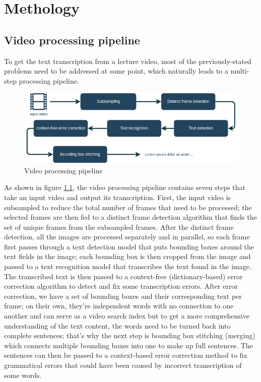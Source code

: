 \chapter{Methology}

\section{Video processing pipeline}

To get the text transcription from a lecture video, most of the previously-stated problems need to be addressed at some point, which naturally leads to a multi-step processing pipeline.

\begin{figure}[H]
        \centering
        \includegraphics[width=140mm]{figures/ocr_pipeline}
        \caption{Video processing pipeline}
        \label{meth:ocr_pipeline}
\end{figure}

As shown in figure \ref{meth:ocr_pipeline}, the video processing pipeline contains seven steps that take an input video and output its transcription. First, the input video is subsampled to reduce the total number of frames that need to be processed; the selected frames are then fed to a distinct frame detection algorithm that finds the set of unique frames from the subsampled frames. After the distinct frame detection, all the images are processed separately and in parallel, so each frame first passes through a text detection model that puts bounding boxes around the text fields in the image; each bounding box is then cropped from the image and passed to a text recognition model that transcribes the text found in the image. The transcribed text is then passed to a context-free (dictionary-based) error correction algorithm to detect and fix some transcription errors. After error correction, we have a set of bounding boxes and their corresponding text per frame; on their own, they're independent words with no connection to one another and can serve as a video search index but to get a more comprehensive understanding of the text content, the words need to be turned back into complete sentences; that's why the next step is bounding box stitching (merging) which connects multiple bounding boxes into one to make up full sentences. The sentences can then be passed to a context-based error correction method to fix grammatical errors that could have been caused by incorrect transcription of some words.


